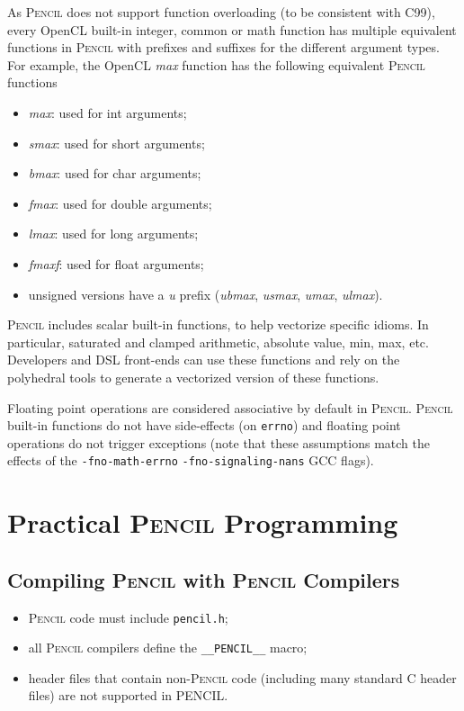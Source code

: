 \documentclass{carp}
\newcommand\pencil{\textsc{Pencil}\xspace}
\begin{document}
As \pencil does not support function overloading (to be consistent
with C99), every OpenCL built-in integer, common or math function
has multiple equivalent functions in \pencil with prefixes and
suffixes for the different argument types.
For example, the OpenCL \emph{max} function has the
following equivalent \pencil functions
\begin{itemize}
 \item \emph{max}: used for int arguments;
 \item \emph{smax}: used for short arguments;
 \item \emph{bmax}: used for char arguments;
 \item \emph{fmax}: used for double arguments;
 \item \emph{lmax}: used for long arguments;
 \item \emph{fmaxf}: used for float arguments;
 \item unsigned versions have a \emph{u} prefix
 (\emph{ubmax}, \emph{usmax}, \emph{umax}, \emph{ulmax}).
\end{itemize}

\pencil includes scalar built-in functions, to help vectorize specific
idioms. In particular, saturated and clamped arithmetic, absolute
value, min, max, etc.  Developers and DSL front-ends can use these
functions and rely on the polyhedral tools to generate a vectorized
version of these functions.

Floating point operations are considered associative by default in \pencil.
\pencil built-in functions do not have side-effects (on \texttt{errno})
and floating point operations do not trigger exceptions (note that these
assumptions match the effects of the \texttt{-fno-math-errno}
\texttt{-fno-signaling-nans} GCC flags).

\chapter{Practical \pencil Programming}

\section{Compiling \pencil with \pencil Compilers}
\begin{itemize}
 \item \pencil code must include \texttt{pencil.h};
 \item all \pencil compilers define the \lstinline!__PENCIL__! macro;
 \item header files that contain non-\pencil code (including many
       standard C header files) are not supported in PENCIL.
\end{itemize}
\end{document}
